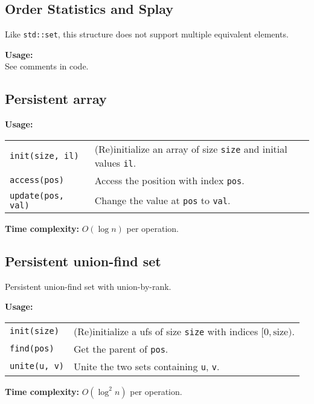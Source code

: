 \subsection{Order Statistics and Splay}
\Warning Like \lstinline|std::set|, this structure does not support multiple equivalent elements. \par
\textbf{Usage:} \\[0.1cm]
See comments in code.



%

\subsection{Persistent array}
\textbf{Usage:} \\[0.1cm]
\begin{tabular}{p{4cm} p{7.5cm}}
  \lstinline|init(size, il)| & (Re)initialize an array of size \lstinline|size| and initial values \lstinline|il|. \\
  \lstinline|access(pos)| & Access the position with index \lstinline|pos|.\\
  \lstinline|update(pos, val)| & Change the value at \lstinline|pos| to \lstinline|val|. \\
\end{tabular} \par
\textbf{Time complexity:} $O(\log n)$ per operation. \par


\subsection{Persistent union-find set}
Persistent union-find set with union-by-rank. \par
\textbf{Usage:} \\[0.1cm]
\begin{tabular}{p{4cm} p{7.5cm}}
  \lstinline|init(size)| & (Re)initialize a ufs of size \lstinline|size| with indices $[0, \mathrm{size})$. \\
  \lstinline|find(pos)| & Get the parent of \lstinline|pos|.\\
  \lstinline|unite(u, v)| & Unite the two sets containing \lstinline|u|, \lstinline|v|. \\
\end{tabular} \par
\textbf{Time complexity:} $O(\log^2 n)$ per operation. \par


